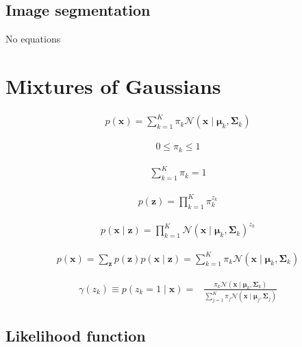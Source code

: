 \documentclass{article}
\begin{document}
\subsection{Image segmentation}
No equations

\section{Mixtures of Gaussians}

\begin{align*}
p(\mathbf{x})=\sum_{k=1}^{K} \pi_{k} \mathcal{N}\left(\mathbf{x} \mid \boldsymbol{\mu}_{k}, \boldsymbol{\Sigma}_{k}\right)
\tag{15.6}
\end{align*}

\begin{align*}
0 \leqslant \pi_{k} \leqslant 1
\tag{15.7}
\end{align*}

\begin{align*}
\sum_{k=1}^{K} \pi_{k}=1
\tag{15.8}
\end{align*}

\begin{align*}
p(\mathbf{z})=\prod_{k=1}^{K} \pi_{k}^{z_{k}}
\tag{15.9}
\end{align*}

\begin{align*}
p(\mathbf{x} \mid \mathbf{z})=\prod_{k=1}^{K} \mathcal{N}\left(\mathbf{x} \mid \boldsymbol{\mu}_{k}, \boldsymbol{\Sigma}_{k}\right)^{z_{k}}
\tag{15.10}
\end{align*}

\begin{align*}
p(\mathbf{x})=\sum_{\mathbf{z}} p(\mathbf{z}) p(\mathbf{x} \mid \mathbf{z})=\sum_{k=1}^{K} \pi_{k} \mathcal{N}\left(\mathbf{x} \mid \boldsymbol{\mu}_{k}, \boldsymbol{\Sigma}_{k}\right)
\tag{15.11}
\end{align*}

\begin{align*}
\gamma\left(z_{k}\right) \equiv p\left(z_{k}=1 \mid \mathbf{x}\right)= & \frac{\pi_{k} \mathcal{N}\left(\mathbf{x} \mid \boldsymbol{\mu}_{k}, \boldsymbol{\Sigma}_{k}\right)}{\sum_{j=1}^{K} \pi_{j} \mathcal{N}\left(\mathbf{x} \mid \boldsymbol{\mu}_{j}, \boldsymbol{\Sigma}_{j}\right)}
\tag{15.12}
\end{align*}

\subsection{Likelihood function}
\end{document}
